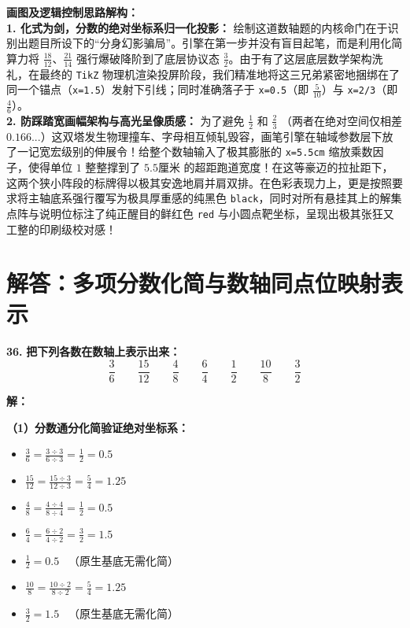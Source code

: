 \vspace{0.4cm}
{\small\color{blue!70!black}
\textbf{画图及逻辑控制思路解构：}\\
\textbf{1. 化式为剑，分数的绝对坐标系归一化投影：} 绘制这道数轴题的内核命门在于识别出题目所设下的“分身幻影骗局”。引擎在第一步并没有盲目起笔，而是利用化简算力将 $\frac{18}{12}$、$\frac{21}{14}$ 强行爆破降阶到了底层协议态 $\frac{3}{2}$。由于有了这层底层数学架构洗礼，在最终的 \texttt{TikZ} 物理机渲染投屏阶段，我们精准地将这三兄弟紧密地捆绑在了同一个锚点（\texttt{x=1.5}）发射下引线；同时准确落子于 \texttt{x=0.5}（即 $\frac{5}{10}$）与 \texttt{x=2/3}（即 $\frac{4}{6}$）。\\
\textbf{2. 防踩踏宽画幅架构与高光呈像质感：} 为了避免 $\frac{1}{2}$ 和 $\frac{2}{3}$ （两者在绝对空间仅相差 $0.166...$）这双塔发生物理撞车、字母相互倾轧毁容，画笔引擎在轴域参数层下放了一记宽宏级别的伸展令！给整个数轴输入了极其膨胀的 \texttt{x=5.5cm} 缩放乘数因子，使得单位 $1$ 整整撑到了 $5.5\text{厘米}$ 的超距跑道宽度！在这等豪迈的拉扯距下，这两个狭小阵段的标牌得以极其安逸地肩并肩双排。在色彩表现力上，更是按照要求将主轴底系强行覆写为极具厚重感的纯黑色 \texttt{black}，同时对所有悬挂其上的解集点阵与说明位标注了纯正醒目的鲜红色 \texttt{red} 与小圆点靶坐标，呈现出极其张狂又工整的印刷级校对感！
}

\newpage



\section{解答：多项分数化简与数轴同点位映射表示}

\vspace{0.6cm}

\textbf{\LARGE 36.} \textbf{把下列各数在数轴上表示出来：}
\[
\frac{3}{6} \qquad \frac{15}{12} \qquad \frac{4}{8} \qquad \frac{6}{4} \qquad \frac{1}{2} \qquad \frac{10}{8} \qquad \frac{3}{2}
\]

\vspace{0.4cm}
\textbf{解：}

\textbf{（1）分数通分化简验证绝对坐标系：}
\begin{itemize}
    \item $\displaystyle \frac{3}{6} = \frac{3 \div 3}{6 \div 3} = \frac{1}{2} = 0.5$
    \item $\displaystyle \frac{15}{12} = \frac{15 \div 3}{12 \div 3} = \frac{5}{4} = 1.25$
    \item $\displaystyle \frac{4}{8} = \frac{4 \div 4}{8 \div 4} = \frac{1}{2} = 0.5$
    \item $\displaystyle \frac{6}{4} = \frac{6 \div 2}{4 \div 2} = \frac{3}{2} = 1.5$
    \item $\displaystyle \frac{1}{2} = 0.5$ \ （原生基底无需化简）
    \item $\displaystyle \frac{10}{8} = \frac{10 \div 2}{8 \div 2} = \frac{5}{4} = 1.25$
    \item $\displaystyle \frac{3}{2} = 1.5$ \ （原生基底无需化简）
\end{itemize}

